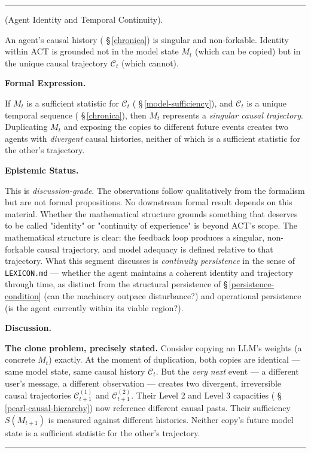 \documentclass[11pt,oneside]{article}
\newcounter{claim}[section]
\renewcommand{\theclaim}{\thesection.\arabic{claim}}
\newenvironment{segment}[2]{%
  \refstepcounter{claim}%
  \bigskip\noindent\hrule\smallskip
  \noindent{\bfseries #1~\theclaim}\enskip(#2).\par\smallskip
  \noindent\ignorespaces
}{%
  \par\smallskip\noindent\hrule\bigskip
}
\newenvironment{discussion}[1][]{\begin{segment}{Discussion}{#1}}{\end{segment}}
\begin{document}
\begin{discussion}[Agent Identity and Temporal Continuity]
\label{agent-identity}
An agent's causal history ( \S\,\ref{chronica}) is singular and non-forkable. Identity within ACT is grounded not in the model state $M_t$ (which can be copied) but in the unique causal trajectory $\mathcal C_t$ (which cannot).



\medskip\noindent\textbf{Formal Expression.}



If $M_t$ is a sufficient statistic for $\mathcal C_t$ ( \S\,\ref{model-sufficiency}), and $\mathcal C_t$ is a unique temporal sequence ( \S\,\ref{chronica}), then $M_t$ represents a \textit{singular causal trajectory}. Duplicating $M_t$ and exposing the copies to different future events creates two agents with \textit{divergent} causal histories, neither of which is a sufficient statistic for the other's trajectory.


\medskip\noindent\textbf{Epistemic Status.}


This is \textit{discussion-grade}. The observations follow qualitatively from the formalism but are not formal propositions. No downstream formal result depends on this material. Whether the mathematical structure grounds something that deserves to be called "identity" or "continuity of experience" is beyond ACT's scope. The mathematical structure is clear: the feedback loop produces a singular, non-forkable causal trajectory, and model adequacy is defined relative to that trajectory. What this segment discusses is \textit{continuity persistence} in the sense of \texttt{LEXICON.md} — whether the agent maintains a coherent identity and trajectory through time, as distinct from the structural persistence of \S\,\ref{persistence-condition} (can the machinery outpace disturbance?) and operational persistence (is the agent currently within its viable region?).


\medskip\noindent\textbf{Discussion.}


\textbf{The clone problem, precisely stated.} Consider copying an LLM's weights (a concrete $M_t$) exactly. At the moment of duplication, both copies are identical — same model state, same causal history $\mathcal C_t$. But the \textit{very next} event — a different user's message, a different observation — creates two divergent, irreversible causal trajectories $\mathcal C_{t+1}^{(1)}$ and $\mathcal C_{t+1}^{(2)}$. Their Level 2 and Level 3 capacities ( \S\,\ref{pearl-causal-hierarchy}) now reference different causal pasts. Their sufficiency $S(M_{t+1})$ is measured against different histories. Neither copy's future model state is a sufficient statistic for the other's trajectory.


\end{discussion}
\end{document}
